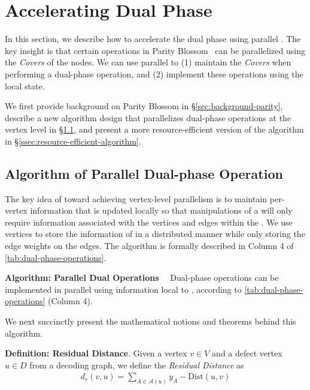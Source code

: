 \section{Accelerating Dual Phase}\label{sec:parallel-dual}



In this section, we describe how to accelerate the dual phase using parallel \pus.
The key insight is that certain operations in Parity Blossom~\cite{wu2023qce} can be parallelized using the \emph{Covers} of the nodes.
We can use parallel \pus to (1) maintain the \emph{Covers} when performing a dual-phase operation, and (2) implement these operations using the local state.

We first provide background on Parity Blossom in \S\ref{sec:background-parity}, describe a new algorithm design that parallelizes dual-phase operations at the vertex level in \S\ref{ssec:vertex-level-parallel-algorithm}, and present a more resource-efficient version of the algorithm in \S\ref{ssec:resource-efficient-algorithm}.



\subsection{Algorithm of Parallel Dual-phase Operation}\label{ssec:vertex-level-parallel-algorithm}

The key idea of \arch toward achieving vertex-level parallelism is to maintain per-vertex information that is updated locally so that manipulations of a \cov will only require information associated with the vertices and edges within the \cov.
We use vertices to store the information of \covs in a distributed manner while only storing the edge weights on the edges.
The algorithm is formally described in Column 4 of \autoref{tab:dual-phase-operations}.

\smallskip\noindent \textbf{Algorithm: Parallel Dual Operations}~~
Dual-phase operations can be implemented in parallel using information local to \pus, according to \autoref{tab:dual-phase-operations} (Column 4).

We next succinctly present the mathematical notions and theorems behind this algorithm.

\smallskip
\textbf{Definition: Residual Distance}. Given a vertex $v \in V$ and a defect vertex $u \in D$ from a decoding graph, we define the \emph{Residual Distance} as
\begin{align*}
    d_r(v, u) = \sum\nolimits_{A \in \mathcal{A}(u)} y_A - \text{Dist}(u, v)
\end{align*}

